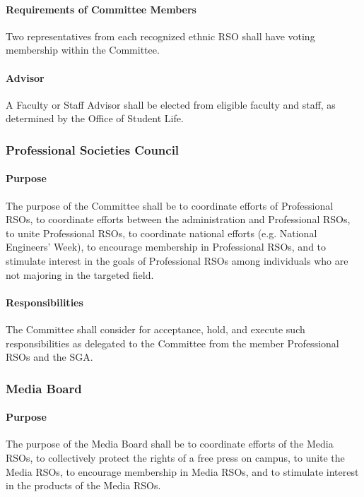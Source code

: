 \documentclass[12pt]{scrreprt}
\begin{document}
\paragraph{Requirements of Committee Members}
Two representatives from each recognized ethnic RSO shall have voting 
membership within the Committee.

\paragraph{Advisor}
A Faculty or Staff Advisor shall be elected from eligible faculty and staff, 
as determined by the Office of Student Life.

\subsubsection{Professional Societies Council}

\paragraph{Purpose}
The purpose of the Committee shall be to coordinate efforts of Professional 
RSOs, to coordinate efforts between the administration and Professional RSOs, 
to unite Professional RSOs, to coordinate national efforts (e.g. National 
Engineers' Week), to encourage membership in Professional RSOs, and to 
stimulate interest in the goals of Professional RSOs among individuals who are 
not majoring in the targeted field.

\paragraph{Responsibilities}
The Committee shall consider for acceptance, hold, and execute such
responsibilities as delegated to the Committee from the member Professional 
RSOs and the SGA.

\subsubsection{Media Board}

\paragraph{Purpose}
The purpose of the Media Board shall be to coordinate efforts of the Media 
RSOs, to collectively protect the rights of a free press on campus, to unite 
the Media RSOs, to encourage membership in Media RSOs, and to stimulate 
interest in the products of the Media RSOs.
\end{document}
